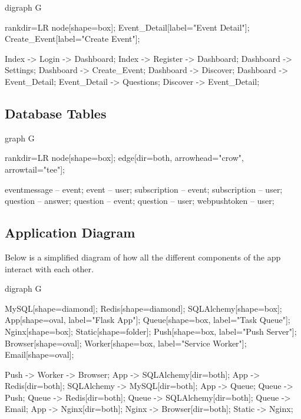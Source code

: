 \documentclass[a4paper,oneside,12pt]{report}
\begin{document}
	\begin{center}
		\begin{dot2tex}
			digraph G {
			rankdir=LR
			node[shape=box];
			Event_Detail[label="Event Detail"];
			Create_Event[label="Create Event"];


			Index -> Login -> Dashboard;
			Index -> Register -> Dashboard;
			Dashboard -> Settings;
			Dashboard -> Create_Event;
			Dashboard -> Discover;
			Dashboard -> Event_Detail;
			Event_Detail -> Questions;
			Discover -> Event_Detail;
			}
		\end{dot2tex}
	\end{center}

	\subsection{Database Tables}
	\begin{center}
		\begin{dot2tex}[neato]
			graph G {
			rankdir=LR
			node[shape=box];
			edge[dir=both, arrowhead="crow", arrowtail="tee"];

			eventmessage -- event;
			event -- user;
			subscription -- event;
			subscription -- user;
			question -- answer;
			question -- event;
			question -- user;
			webpushtoken -- user;
			}
		\end{dot2tex}
	\end{center}

	\subsection{Application Diagram}
	Below is a simplified diagram of how all the different components of the app interact with each other.
	\begin{center}
		\begin{dot2tex}
			digraph G {
			MySQL[shape=diamond];
			Redis[shape=diamond];
			SQLAlchemy[shape=box];
			App[shape=oval, label="Flask App"];
			Queue[shape=box, label="Task Queue"];
			Nginx[shape=box];
			Static[shape=folder];
			Push[shape=box, label="Push Server"];
			Browser[shape=oval];
			Worker[shape=box, label="Service Worker"];
			Email[shape=oval];

			Push -> Worker -> Browser;
			App -> SQLAlchemy[dir=both];
			App -> Redis[dir=both];
			SQLAlchemy -> MySQL[dir=both];
			App -> Queue;
			Queue -> Push;
			Queue -> Redis[dir=both];
			Queue -> SQLAlchemy[dir=both];
			Queue -> Email;
			App -> Nginx[dir=both];
			Nginx -> Browser[dir=both];
			Static -> Nginx;

			}
		\end{dot2tex}
	\end{center}
\end{document}
